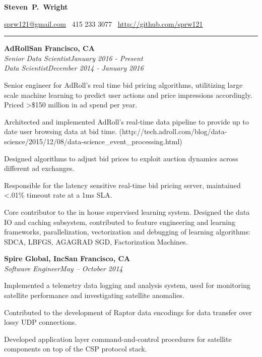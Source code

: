 \documentclass{article}
\newcommand{\ressection}[1]{\noindent{\large\textbf{#1}}\vspace{2pt}\hrule\vspace{4pt}}
\newcommand{\leftandright}[2]{\noindent\textbf{#1}\hfill\textbf{#2}}
\newcommand{\leftandrighti}[2]{\indent\textit{#1}\hfill\textit{#2}}
\begin{document}
\sffamily

\begin{center}
\textbf{\huge{Steven~P.~Wright}}

\href{mailto:sprw121@gmail.com}{sprw121@gmail.com}
\textbullet\, 415 233 3077
\textbullet\, \href{https://github.com/sprw121}{http://github.com/sprw121}
\end{center}

\ressection{Work experience}

\leftandright{AdRoll}{San Francisco, CA} \\
\leftandrighti{Senior Data Scientist}
	      {January 2016 - Present}\\
\leftandrighti{Data Scientist}
	      {December 2014 - January 2016}

\begin{itemize*}
\item Senior engineer for AdRoll's real time bid pricing algorithms, utilitizing
  large scale machine learning to predict user actions and price impressions accordingly.
  Priced \textgreater \$150 million in ad spend per year.
\item Architected and implemented AdRoll's real-time data pipeline to provide up to date
  user browsing data at bid time. (http://tech.adroll.com/blog/data-science/2015/12/08/data-science\_event\_processing.html)
\item Designed algorithms to adjust bid prices to exploit auction dynamics across
  different ad exchanges.
\item Responsible for the latency sensitive real-time bid pricing server,
  maintained \textless .01\% timeout rate at a 1ms SLA.
\item Core contributor to the in house supervised learning system. Designed the
  data IO and caching subsystem, contributed to feature engineering and learning frameworks,
  parallelization, vectorization and debugging of learning algorithms: SDCA, LBFGS, AGAGRAD SGD,
  Factorization Machines.
\end{itemize*}

\leftandright{Spire Global, Inc}{San Francisco, CA} \\
\leftandrighti{Software Engineer}{May -- October 2014}

\begin{itemize*}
\item Implemented a telemetry data logging and analysis system,
 used for monitoring satellite performance and investigating satellite anomalies.
\item Contributed to the development of Raptor data encodings for data transfer over
  lossy UDP connections.
\item Developed application layer command-and-control procedures for satellite components
  on top of the CSP protocol stack.
\end{itemize*}
\end{document}
